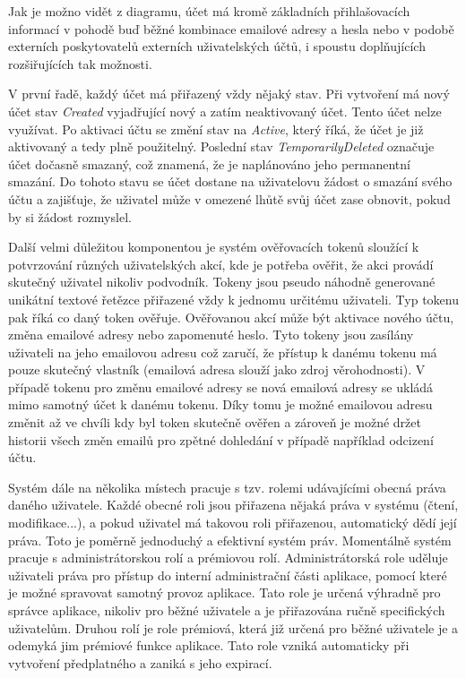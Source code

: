 		Jak je možno vidět z diagramu, účet má kromě základních přihlašovacích informací v pohodě buď běžné kombinace emailové adresy
		a hesla nebo v podobě externích poskytovatelů externích uživatelských účtů, i spoustu
		doplňujících rozšiřujících tak možnosti.

		V první řadě, každý účet má přiřazený vždy nějaký stav.
		Při vytvoření má nový účet stav \emph{Created} vyjadřující nový a zatím neaktivovaný účet.
		Tento účet nelze využívat.
		Po aktivaci účtu se změní stav na \emph{Active}, který říká, že účet je již aktivovaný a tedy plně použitelný.
		Poslední stav \emph{TemporarilyDeleted} označuje účet dočasně smazaný, což znamená, že je naplánováno jeho permanentní
		smazání.
		Do tohoto stavu se účet dostane na uživatelovu žádost o smazání svého účtu a zajišťuje, že uživatel může v omezené
		lhůtě svůj účet zase obnovit, pokud by si žádost rozmyslel.

		Další velmi důležitou komponentou je systém ověřovacích tokenů sloužící k potvrzování různých uživatelských akcí, kde
		je potřeba ověřit, že akci provádí skutečný uživatel nikoliv podvodník.
		Tokeny jsou pseudo náhodně generované unikátní textové řetězce přiřazené vždy k jednomu určitému uživateli.
		Typ tokenu pak říká co daný token ověřuje.
		Ověřovanou akcí může být aktivace nového účtu, změna emailové adresy nebo zapomenuté heslo.
		Tyto tokeny jsou zasílány uživateli na jeho emailovou adresu což zaručí, že přístup k danému tokenu má pouze skutečný
		vlastník (emailová adresa slouží jako zdroj věrohodnosti).
		V případě tokenu pro změnu emailové adresy se nová emailová adresy se ukládá mimo samotný účet k danému tokenu.
		Díky tomu je možné emailovou adresu změnit až ve chvíli kdy byl token skutečně ověřen a zároveň je možné držet
		historii všech změn emailů pro zpětné dohledání v případě například odcizení účtu.

		Systém dále na několika místech pracuje s tzv. rolemi udávajícími obecná práva daného uživatele.
		Každé obecné roli jsou přiřazena nějaká práva v systému (čtení, modifikace...), a pokud uživatel má takovou roli
		přiřazenou, automatický dědí její práva.
		Toto je poměrně jednoduchý a efektivní systém práv.
		Momentálně systém pracuje s administrátorskou rolí a prémiovou rolí.
		Administrátorská role uděluje uživateli práva pro přístup do interní administrační části
		aplikace, pomocí které je možné spravovat samotný provoz aplikace.
		Tato role je určená výhradně pro správce aplikace, nikoliv pro běžné uživatele a je přiřazována ručně specifických
		uživatelům.
		Druhou rolí je role prémiová, která již určená pro běžné uživatele je a odemyká jim prémiové funkce aplikace.
		Tato role vzniká automaticky při vytvoření předplatného a zaniká s jeho expirací.

